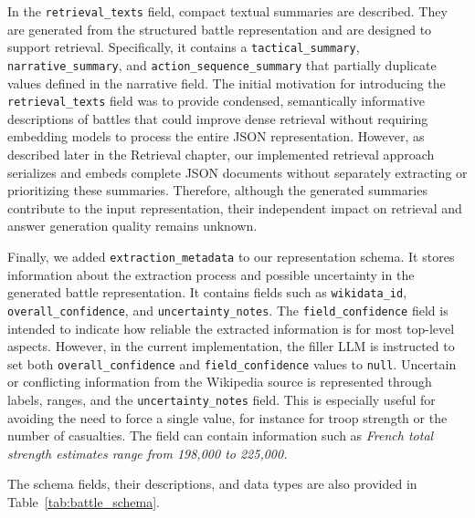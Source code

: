 In the \texttt{retrieval\_texts} field, compact textual summaries are described. They are generated from the structured battle representation and are designed to support retrieval. Specifically, it contains a \texttt{tactical\_summary}, \texttt{narrative\_summary}, and \texttt{action\_sequence\_summary} that partially duplicate values defined in the narrative field. The initial motivation for introducing the \texttt{retrieval\_texts} field was to provide condensed, semantically informative descriptions of battles that could improve dense retrieval without requiring embedding models to process the entire JSON representation. However, as described later in the Retrieval chapter, our implemented retrieval approach serializes and embeds complete JSON documents without separately extracting or prioritizing these summaries. Therefore, although the generated summaries contribute to the input representation, their independent impact on retrieval and answer generation quality remains unknown.

Finally, we added \texttt{extraction\_metadata} to our representation schema. It stores information about the extraction process and possible uncertainty in the generated battle representation. It contains fields such as \texttt{wikidata\_id}, \texttt{overall\_confidence}, and \texttt{uncertainty\_notes}. The \texttt{field\_confidence} field is intended to indicate how reliable the extracted information is for most top-level aspects. However, in the current implementation, the filler LLM is instructed to set both \texttt{overall\_confidence} and \texttt{field\_confidence} values to \texttt{null}. Uncertain or conflicting information from the Wikipedia source is represented through labels, ranges, and the \texttt{uncertainty\_notes} field. This is especially useful for avoiding the need to force a single value, for instance for troop strength or the number of casualties. The field can contain information such as \textit{French total strength estimates range from 198,000 to 225,000.}

The schema fields, their descriptions, and data types are also provided in Table~\ref{tab:battle_schema}.

